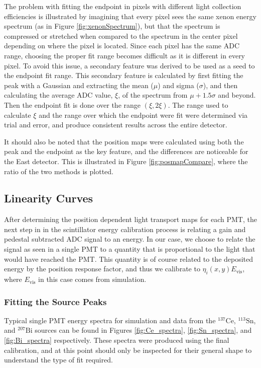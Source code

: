 The problem with fitting the endpoint in pixels with different light collection efficiencies is illustrated by
imagining that every pixel sees the same xenon energy spectrum (as in Figure \ref{fig:xenonSpectrum}), but that
the spectrum is compressed or stretched when compared to the spectrum in the center pixel depending on where
the pixel is located. Since each pixel has the same ADC range, choosing the proper fit range becomes difficult
as it is different in every pixel. To avoid this issue, a secondary feature was derived to be used as a
seed to the endpoint fit range. This secondary feature is calculated by first fitting the peak with a Gaussian
and extracting the mean ($\mu$) and sigma ($\sigma$), and then calculating the average ADC value, $\xi$, of the spectrum
from $\mu+1.5\sigma$ and beyond. Then the endpoint fit is done over the range $(\xi,2\xi)$. The range used to
calculate $\xi$ and the range over which the endpoint were fit were determined via trial and error, and produce
consistent results across the entire detector.

It should also be noted that the position maps were calculated using both the peak and the endpoint as the key
feature, and the differences are noticeable for the East detector. This is illustrated in Figure \ref{fig:posmapCompare}, where the
ratio of the two methods is plotted.



\subsection{Linearity Curves} \label{ssec:linCurves}
After determining the position dependent light transport maps for each PMT,
the next step in in the scintillator energy calibration process is relating a gain and pedestal subtracted ADC signal
to an energy. In our case, we choose to relate the signal as seen in a single PMT to a quantity that is
proportional to the light that would have reached the PMT. This quantity is of course related to the deposited
energy by the position response factor, and thus we calibrate to $\eta_i(x,y)E_{\mathrm{vis}}$, where $E_{\mathrm{vis}}$ in this
case comes from simulation.

\subsubsection{Fitting the Source Peaks}
Typical single PMT energy spectra for simulation and data from the $^{137}\mathrm{Ce}$, $^{113}\mathrm{Sn}$, and $^{207}\mathrm{Bi}$ sources can be
found in Figures \ref{fig:Ce_spectra}, \ref{fig:Sn_spectra}, and \ref{fig:Bi_spectra} respectively. These spectra were produced using the final
calibration, and at this point should only be inspected for their general shape to understand the type of fit required.

